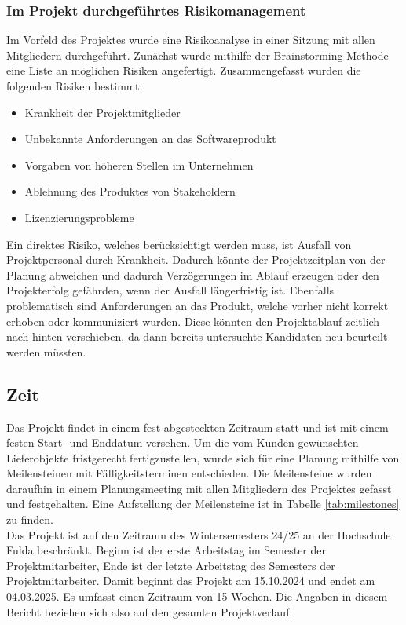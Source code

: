 \documentclass[ThesisDJ.tex]{subfiles}
\begin{document}
\subsubsection{Im Projekt durchgeführtes Risikomanagement}
Im Vorfeld des Projektes wurde eine Risikoanalyse in einer Sitzung mit allen Mitgliedern durchgeführt. Zunächst wurde mithilfe der Brainstorming-Methode eine Liste an möglichen Risiken angefertigt. Zusammengefasst wurden die folgenden Risiken bestimmt:

\begin{itemize}
    \item Krankheit der Projektmitglieder
    \item Unbekannte Anforderungen an das Softwareprodukt
    \item Vorgaben von höheren Stellen im Unternehmen
    \item Ablehnung des Produktes von Stakeholdern
    \item Lizenzierungsprobleme
\end{itemize}

Ein direktes Risiko, welches berücksichtigt werden muss, ist Ausfall von Projektpersonal durch Krankheit. Dadurch könnte der Projektzeitplan von der Planung abweichen und dadurch Verzögerungen im Ablauf erzeugen oder den Projekterfolg gefährden, wenn der Ausfall längerfristig ist. Ebenfalls problematisch sind Anforderungen an das Produkt, welche vorher nicht korrekt erhoben oder kommuniziert wurden. Diese könnten den Projektablauf zeitlich nach hinten verschieben, da dann bereits untersuchte Kandidaten neu beurteilt werden müssten.

\subsection{Zeit}
Das Projekt findet in einem fest abgesteckten Zeitraum statt und ist mit einem festen Start- und Enddatum versehen.
Um die vom Kunden gewünschten Lieferobjekte fristgerecht fertigzustellen, wurde sich für eine Planung mithilfe von Meilensteinen mit
Fälligkeitsterminen entschieden. Die Meilensteine wurden daraufhin in einem Planungsmeeting mit allen Mitgliedern des Projektes gefasst und festgehalten.
Eine Aufstellung der Meilensteine ist in Tabelle \ref{tab:milestones} zu finden.\\

Das Projekt ist auf den Zeitraum des Wintersemesters 24/25 an der Hochschule Fulda beschränkt.
Beginn ist der erste Arbeitstag im Semester der Projektmitarbeiter, Ende ist der letzte Arbeitstag des Semesters der Projektmitarbeiter. 
Damit beginnt das Projekt am 15.10.2024 und endet am 04.03.2025. Es umfasst einen Zeitraum von 15 Wochen. 
Die Angaben in diesem Bericht beziehen sich also auf den gesamten Projektverlauf.
\end{document}
